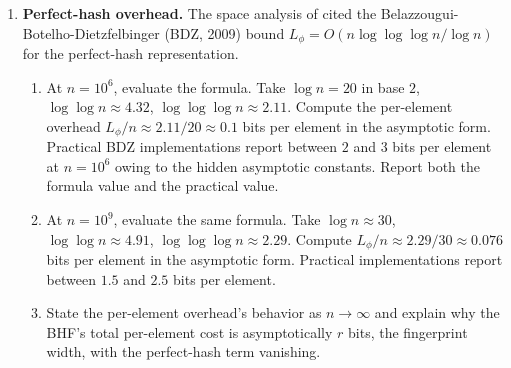 \begin{enumerate}
\item \exstarstar
\label{ex:ch14-7}
\textbf{Perfect-hash overhead.}
The space analysis of  cited the
Belazzougui-Botelho-Dietzfelbinger (BDZ, 2009) bound
$L_\phi = O(n \log \log \log n / \log n)$ for the perfect-hash
representation.
\begin{enumerate}
  \item[(a)] At $n = 10^6$, evaluate the formula. Take $\log n = 20$
    in base $2$, $\log \log n \approx 4.32$, $\log \log \log n
    \approx 2.11$. Compute the per-element overhead $L_\phi / n
    \approx 2.11 / 20 \approx 0.1$ bits per element in the
    asymptotic form. Practical BDZ implementations report between
    $2$ and $3$ bits per element at $n = 10^6$ owing to the hidden
    asymptotic constants. Report both the formula value and the
    practical value.
  \item[(b)] At $n = 10^9$, evaluate the same formula. Take $\log n
    \approx 30$, $\log \log n \approx 4.91$, $\log \log \log n
    \approx 2.29$. Compute $L_\phi / n \approx 2.29 / 30 \approx
    0.076$ bits per element in the asymptotic form. Practical
    implementations report between $1.5$ and $2.5$ bits per
    element.
  \item[(c)] State the per-element overhead's behavior as $n \to
    \infty$ and explain why the BHF's total per-element cost is
    asymptotically $r$ bits, the fingerprint width, with the
    perfect-hash term vanishing.
\end{enumerate}


\end{enumerate}
